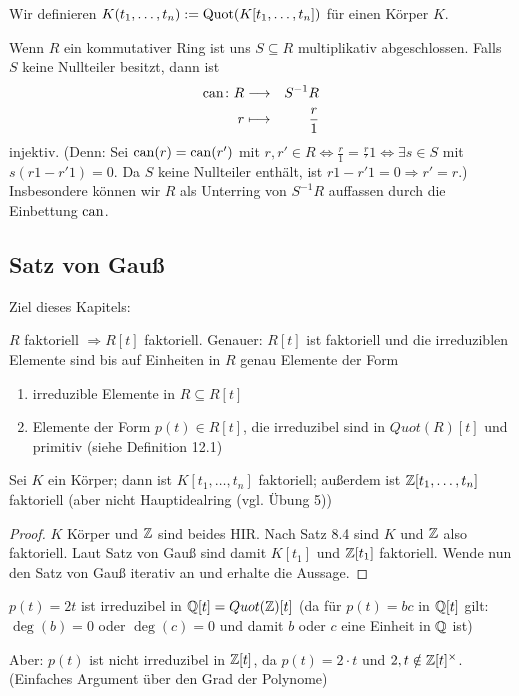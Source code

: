 \documentclass[12pt,a4paper]{scrartcl}
\begin{document}
Wir definieren $K(t_1,\dots,t_n) := \operatorname{Quot}(K[t_1,\dots,t_n])$ für einen Körper $K$.


\begin{bem}
	Wenn $R$ ein kommutativer Ring ist uns $S\subseteq R$ multiplikativ abgeschlossen. Falls $S$ keine Nullteiler besitzt, dann ist
	\begin{eqnarray*}
		 \operatorname{can}\colon R &\longrightarrow& S^{-1}R\\
		 r & \longmapsto& \frac r1
	\end{eqnarray*}
	injektiv. (Denn: Sei $\operatorname{can}(r) = \operatorname{can}(r')$ mit $r,r'\in R\Leftrightarrow \frac r1 = \frac r'1 \Leftrightarrow \exists s\in S$ mit $ s(r1-r'1) = 0$. Da $S$ keine Nullteiler enthält, ist $r1 -r'1 = 0\Rightarrow r' = r$.) Insbesondere können wir $R$ als Unterring von $S^{-1}R$ auffassen durch die Einbettung $\operatorname{can}$.
\end{bem}



\subsection{Satz von Gauß}
Ziel dieses Kapitels:
\begin{satz}[Gauß]
	$R$ faktoriell $\Rightarrow R[t]$ faktoriell.
	Genauer: $R[t]$ ist faktoriell und die irreduziblen Elemente sind bis auf Einheiten in $R$ genau Elemente der Form
	\begin{enumerate}
		\item irreduzible Elemente in $R\subseteq R[t]$
		\item Elemente der Form $p(t) \in R[t]$, die irreduzibel sind in $Quot(R)[t]$ und primitiv (siehe Definition 12.1)
	\end{enumerate}
\end{satz}

\begin{kor}
	Sei $K$ ein Körper; dann ist $K[t_1,\dots,t_n]$ faktoriell; außerdem ist $\mathbb Z[t_1,\dots, t_n]$ faktoriell (aber nicht Hauptidealring (vgl. Übung 5))
\end{kor}

\begin{proof} $K$ Körper und $\mathbb Z$ sind beides HIR. Nach Satz 8.4 sind $K$ und $\mathbb Z$ also faktoriell. Laut Satz von Gauß sind damit $K[t_1]$ und $\mathbb Z[t_1]$ faktoriell. Wende nun den Satz von Gauß iterativ an und erhalte die Aussage.
\end{proof}

\begin{bsp}
	$p(t) = 2t$ ist irreduzibel in $\mathbb Q[t] = Quot(\mathbb Z)[t]$ (da für $p(t) = bc$ in $\mathbb Q[t]$ gilt: $\deg(b) = 0$ oder $\deg(c) = 0$ und damit $b$ oder $c$ eine Einheit in $\mathbb Q$ ist)
	
	Aber: $p(t)$ ist nicht irreduzibel in $\mathbb Z[t]$, da $p(t) = 2\cdot t$ und $2, t\notin \mathbb Z[t]^{\times}$. (Einfaches Argument über den Grad der Polynome)
\end{bsp}
\end{document}
